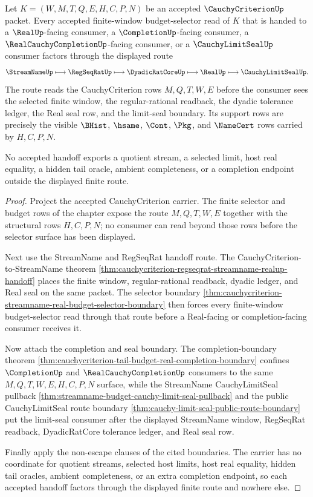 \begin{theorem}
\label{thm:cauchy-criterion-finite-window-real-seal-handoff}
Let $K=(W,M,T,Q,E,H,C,P,N)$ be an accepted $\CauchyCriterionUp$ packet. Every
accepted finite-window budget-selector read of $K$ that is handed to a
$\RealUp$-facing consumer, a $\CompletionUp$-facing consumer, a
$\RealCauchyCompletionUp$-facing consumer, or a $\CauchyLimitSealUp$ consumer
factors through the displayed route
$$
\StreamNameUp
\longmapsto \RegSeqRatUp
\longmapsto \DyadicRatCoreUp
\longmapsto \RealUp
\longmapsto \CauchyLimitSealUp.
$$
The route reads the CauchyCriterion rows $M,Q,T,W,E$ before the consumer sees
the selected finite window, the regular-rational readback, the dyadic
tolerance ledger, the Real seal row, and the limit-seal boundary. Its support
rows are precisely the visible $\BHist$, $\hsame$, $\Cont$, $\Pkg$, and
$\NameCert$ rows carried by $H,C,P,N$.

No accepted handoff exports a quotient stream, a selected limit, host real
equality, a hidden tail oracle, ambient completeness, or a completion endpoint
outside the displayed finite route.
\end{theorem}
\begin{proof}
Project the accepted CauchyCriterion carrier. The finite selector and budget
rows of the chapter expose the route $M,Q,T,W,E$ together with the structural
rows $H,C,P,N$; no consumer can read beyond those rows before the selector
surface has been displayed.

Next use the StreamName and RegSeqRat handoff route. The
CauchyCriterion-to-StreamName theorem
\autoref{thm:cauchycriterion-regseqrat-streamname-realup-handoff} places the
finite window, regular-rational readback, dyadic ledger, and Real seal on the
same packet. The selector boundary
\autoref{thm:cauchycriterion-streamname-real-budget-selector-boundary} then
forces every finite-window budget-selector read through that route before a
Real-facing or completion-facing consumer receives it.

Now attach the completion and seal boundary. The completion-boundary theorem
\autoref{thm:cauchycriterion-tail-budget-real-completion-boundary} confines
$\CompletionUp$ and $\RealCauchyCompletionUp$ consumers to the same
$M,Q,T,W,E,H,C,P,N$ surface, while the StreamName CauchyLimitSeal pullback
\autoref{thm:streamname-budget-cauchy-limit-seal-pullback} and the public
CauchyLimitSeal route boundary
\autoref{thm:cauchy-limit-seal-public-route-boundary} put the limit-seal
consumer after the displayed StreamName window, RegSeqRat readback,
DyadicRatCore tolerance ledger, and Real seal row.

Finally apply the non-escape clauses of the cited boundaries. The carrier has
no coordinate for quotient streams, selected host limits, host real equality,
hidden tail oracles, ambient completeness, or an extra completion endpoint, so
each accepted handoff factors through the displayed finite route and nowhere
else.
\end{proof}

